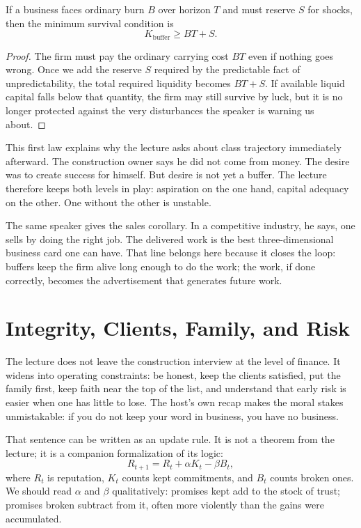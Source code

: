 \begin{proposition}
If a business faces ordinary burn \(B\) over horizon \(T\) and must reserve \(S\) for shocks, then the minimum survival condition is
\begin{equation}
K_{\text{buffer}} \ge BT + S.
\end{equation}
\end{proposition}

\begin{proof}
The firm must pay the ordinary carrying cost \(BT\) even if nothing goes wrong. Once we add the reserve \(S\) required by the predictable fact of unpredictability, the total required liquidity becomes \(BT+S\). If available liquid capital falls below that quantity, the firm may still survive by luck, but it is no longer protected against the very disturbances the speaker is warning us about.
\end{proof}

This first law explains why the lecture asks about class trajectory immediately afterward. The construction owner says he did not come from money. The desire was to create success for himself. But desire is not yet a buffer. The lecture therefore keeps both levels in play: aspiration on the one hand, capital adequacy on the other. One without the other is unstable.

The same speaker gives the sales corollary. In a competitive industry, he says, one sells by doing the right job. The delivered work is the best three-dimensional business card one can have. That line belongs here because it closes the loop: buffers keep the firm alive long enough to do the work; the work, if done correctly, becomes the advertisement that generates future work.

\section{Integrity, Clients, Family, and Risk}

The lecture does not leave the construction interview at the level of finance. It widens into operating constraints: be honest, keep the clients satisfied, put the family first, keep faith near the top of the list, and understand that early risk is easier when one has little to lose. The host's own recap makes the moral stakes unmistakable: if you do not keep your word in business, you have no business.

That sentence can be written as an update rule. It is not a theorem from the lecture; it is a companion formalization of its logic:
\begin{equation}
R_{t+1} = R_t + \alpha K_t - \beta B_t,
\end{equation}
where \(R_t\) is reputation, \(K_t\) counts kept commitments, and \(B_t\) counts broken ones. We should read \(\alpha\) and \(\beta\) qualitatively: promises kept add to the stock of trust; promises broken subtract from it, often more violently than the gains were accumulated.

